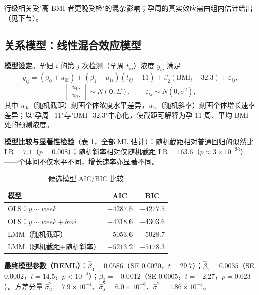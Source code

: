 \documentclass[11pt,a4paper]{ctexart}
\begin{document}
行级相关受"高 BMI 者更晚受检"的混杂影响；孕周的真实效应需由组内估计给出（见下节）。

\subsection{关系模型：线性混合效应模型}
\textbf{模型设定}。孕妇 $i$ 的第 $j$ 次检测（孕周 $t_{ij}$）浓度 $y_{ij}$ 满足
\begin{equation}
y_{ij}=(\beta_0+u_{0i})+(\beta_1+u_{1i})(t_{ij}-11)+\beta_2(\mathrm{BMI}_i-32.3)+\varepsilon_{ij},
\label{eq:lmm}
\end{equation}
\begin{equation}
\begin{bmatrix}u_{0i}\\u_{1i}\end{bmatrix}\sim N(\mathbf{0},\Sigma),\qquad
\varepsilon_{ij}\sim N(0,\sigma^2),
\label{eq:lmm-re}
\end{equation}
其中 $u_{0i}$（随机截距）刻画个体浓度水平差异，$u_{1i}$（随机斜率）刻画个体增长速率差异；以"孕周$-11$"与"BMI$-32.3$"中心化，使截距可解释为孕 11 周、平均 BMI 处的预测浓度。

\textbf{模型比较与显著性检验}（表 \ref{tab:aic}，全部 ML 估计）：随机截距相对普通回归的似然比 $\mathrm{LR}=7.1$（$p=0.008$）；随机斜率相对仅随机截距 $\mathrm{LR}=163.6$（$p\approx3\times10^{-36}$）——个体间不仅水平不同，增长速率亦显著不同。

\begin{table}[H]
\centering\small
\caption{候选模型 AIC/BIC 比较}\label{tab:aic}
\begin{tabular}{lcc}
\toprule
模型 & AIC & BIC\\
\midrule
OLS：$y\sim week$ & $-4287.5$ & $-4277.5$\\
OLS：$y\sim week+bmi$ & $-4318.6$ & $-4303.6$\\
LMM（随机截距） & $-5053.6$ & $-5028.7$\\
LMM（随机截距$+$随机斜率） & $\mathbf{-5213.2}$ & $\mathbf{-5178.3}$\\
\bottomrule
\end{tabular}
\end{table}

\textbf{最终模型参数（REML）}：$\hat\beta_0=0.0586$（SE $0.0020$，$t=29.7$）；$\hat\beta_1=0.0035$（SE $0.0002$，$t=14.5$，$p<10^{-4}$）；$\hat\beta_2=-0.0012$（SE $0.0005$，$t=-2.27$，$p=0.023$）。方差分量 $\hat\sigma_u^2=7.9\times10^{-4}$、$\hat\sigma_s^2=6.0\times10^{-6}$、$\hat\sigma^2=1.86\times10^{-4}$。
\end{document}
